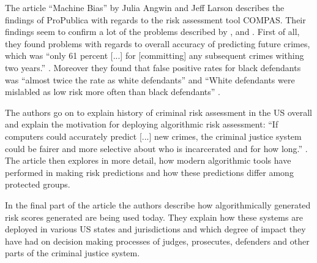 The article \enquote{Machine Bias} by Julia Angwin and Jeff Larson describes the findings 
of ProPublica with regards to the risk assessment tool COMPAS. Their findings seem to confirm
a lot of the problems described by \cite{Barocas.2016}, \cite{barocas-hardt-narayanan} and
\cite{Berk.2018}. First of all, they found problems with regards to overall accuracy of 
predicting future crimes, which was \enquote{only 61 percent [...] for [committing] any 
subsequent crimes withing two years.} \cite{machinebias}. Moreover they found that false 
positive rates for black defendants was \enquote{almost twice the rate as white defendants}
\cite{machinebias} and \enquote{White defendants were mislabled as low risk more often 
than black defendants} \cite{machinebias}.

The authors go on to explain history of criminal risk assessment in the US overall and 
explain the motivation for deploying algorithmic risk assessment: \enquote{If computers
could accurately predict [...] new crimes, the criminal justice system could be fairer 
and more selective about who is incarcerated and for how long.} \cite{machinebias}. The 
article then explores in more detail, how modern algorithmic tools have performed in 
making risk predictions and how these predictions differ among protected groups.

In the final part of the article the authors describe how algorithmically generated risk 
scores generated are being used today. They explain how these systems are deployed in 
various US states and jurisdictions and which degree of impact they have had on decision 
making processes of judges, prosecutes, defenders and other parts of the criminal justice 
system.